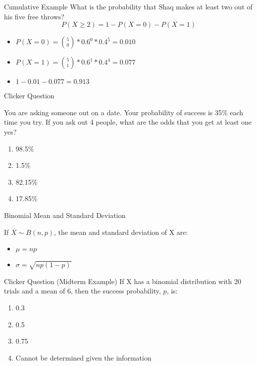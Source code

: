 \documentclass{beamer}
\begin{document}
\begin{frame}{Cumulative Example}
	What is the probability that Shaq makes at least two out of his five free throws?
	$$P(X\geq2)=1-P(X=0)-P(X=1)$$
	\begin{itemize}
		\item $P(X=0)= {5 \choose 0}*0.6^0*0.4^5 = 0.010$
		\item $P(X=1)= {5 \choose 1}*0.6^1*0.4^4 = 0.077$
		\item $1 - 0.01 - 0.077 = 0.913$
	\end{itemize}
\end{frame}

\begin{frame}{Clicker Question}
	
	You are asking someone out on a date. Your probability of success is 35\% each time you try. If you ask out 4 people, what are the odds that you get at least one yes?
	
	\begin{enumerate}[label=(\alph*)]
		\item 98.5\%
		\item 1.5\%
		\item 82.15\%
		\item 17.85\%
	\end{enumerate}
	
\end{frame}


\begin{frame}{Binomial Mean and Standard Deviation}
	
	If $X \sim B(n,p)$, the \alert{mean} and \alert{standard deviation} of X are:
	\begin{itemize}
		\item $\mu = np$
		\item $\sigma = \sqrt{np(1-p)}$
	\end{itemize}
	
\end{frame}

\begin{frame}{Clicker Question (Midterm Example)}
	If X has a binomial distribution with 20 trials and a mean of 6, then the success probability, $p$, is:
	\begin{enumerate}[label=(\alph*)]
		\item 0.3
		\item 0.5
		\item 0.75
		\item Cannot be determined given the information
	\end{enumerate}
\end{frame}
\end{document}
